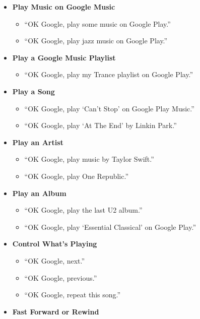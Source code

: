\documentclass[
  jou,
  floatsintext,
  longtable,
  a4paper,
  nolmodern,
  notxfonts,
  notimes,
  colorlinks=true,linkcolor=blue,citecolor=blue,urlcolor=blue]{apa7}
\providecommand{\tightlist}{%
  \setlength{\itemsep}{0pt}\setlength{\parskip}{0pt}}
\begin{document}
\begin{itemize}
\tightlist
\item
  \textbf{Play Music on Google Music}

  \begin{itemize}
  \tightlist
  \item
    ``OK Google, play some music on Google Play.''
  \item
    ``OK Google, play jazz music on Google Play.''
  \end{itemize}
\item
  \textbf{Play a Google Music Playlist}

  \begin{itemize}
  \tightlist
  \item
    ``OK Google, play my Trance playlist on Google Play.''
  \end{itemize}
\item
  \textbf{Play a Song}

  \begin{itemize}
  \tightlist
  \item
    ``OK Google, play `Can't Stop' on Google Play Music.''
  \item
    ``OK Google, play `At The End' by Linkin Park.''
  \end{itemize}
\item
  \textbf{Play an Artist}

  \begin{itemize}
  \tightlist
  \item
    ``OK Google, play music by Taylor Swift.''
  \item
    ``OK Google, play One Republic.''
  \end{itemize}
\item
  \textbf{Play an Album}

  \begin{itemize}
  \tightlist
  \item
    ``OK Google, play the last U2 album.''
  \item
    ``OK Google, play `Essential Classical' on Google Play.''
  \end{itemize}
\item
  \textbf{Control What's Playing}

  \begin{itemize}
  \tightlist
  \item
    ``OK Google, next.''
  \item
    ``OK Google, previous.''
  \item
    ``OK Google, repeat this song.''
  \end{itemize}
\item
  \textbf{Fast Forward or Rewind}


\end{itemize}
\end{document}
